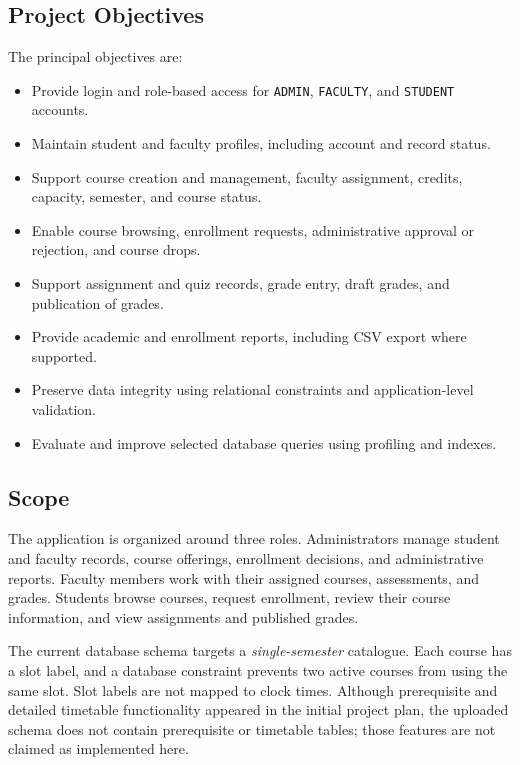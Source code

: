 \subsection{Project Objectives}
The principal objectives are:
\begin{itemize}
    \item Provide login and role-based access for \texttt{ADMIN}, \texttt{FACULTY}, and \texttt{STUDENT} accounts.
    \item Maintain student and faculty profiles, including account and record status.
    \item Support course creation and management, faculty assignment, credits, capacity, semester, and course status.
    \item Enable course browsing, enrollment requests, administrative approval or rejection, and course drops.
    \item Support assignment and quiz records, grade entry, draft grades, and publication of grades.
    \item Provide academic and enrollment reports, including CSV export where supported.
    \item Preserve data integrity using relational constraints and application-level validation.
    \item Evaluate and improve selected database queries using profiling and indexes.
\end{itemize}

\subsection{Scope}
The application is organized around three roles. Administrators manage student and faculty records, course offerings, enrollment decisions, and administrative reports. Faculty members work with their assigned courses, assessments, and grades. Students browse courses, request enrollment, review their course information, and view assignments and published grades.

The current database schema targets a \emph{single-semester} catalogue. Each course has a slot label, and a database constraint prevents two active courses from using the same slot. Slot labels are not mapped to clock times. Although prerequisite and detailed timetable functionality appeared in the initial project plan, the uploaded schema does not contain prerequisite or timetable tables; those features are not claimed as implemented here.


